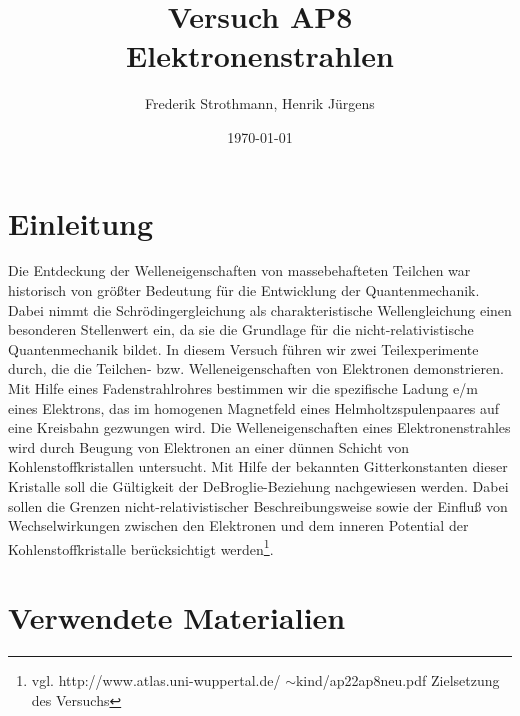 \documentclass[12pt,a4paper]{article}
\title{Versuch AP8\\ Elektronenstrahlen}
\author{Frederik Strothmann, Henrik Jürgens}
\date{\today}
\begin{document}
\maketitle
\newpage
\tableofcontents
\newpage
\section{Einleitung}
Die Entdeckung der Welleneigenschaften von massebehafteten Teilchen war historisch von größter Bedeutung
für die Entwicklung der Quantenmechanik. Dabei nimmt die Schrödingergleichung als charakteristische Wellengleichung einen besonderen Stellenwert ein, da sie die Grundlage für die nicht-relativistische Quantenmechanik
bildet. In diesem Versuch führen wir zwei Teilexperimente durch, die die Teilchen- bzw. Welleneigenschaften von Elektronen demonstrieren. Mit Hilfe eines Fadenstrahlrohres bestimmen wir die spezifische Ladung e/m eines Elektrons, das im homogenen Magnetfeld eines Helmholtzspulenpaares auf eine Kreisbahn gezwungen wird.
Die Welleneigenschaften eines Elektronenstrahles wird durch Beugung von Elektronen an einer dünnen Schicht von Kohlenstoffkristallen untersucht. Mit Hilfe der bekannten Gitterkonstanten dieser Kristalle soll die Gültigkeit der DeBroglie-Beziehung nachgewiesen werden. Dabei sollen die Grenzen nicht-relativistischer Beschreibungsweise sowie der Einfluß von Wechselwirkungen zwischen den Elektronen und dem inneren Potential der Kohlenstoffkristalle berücksichtigt werden\footnote{vgl. http://www.atlas.uni-wuppertal.de/
$\sim$kind/ap22ap8neu.pdf Zielsetzung des Versuchs}.

\section{Verwendete Materialien}
\end{document}
